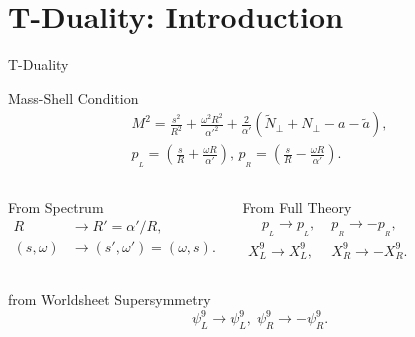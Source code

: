 \section{T-Duality: Introduction}
\begin{frame}{T-Duality}
	\begin{block}{Mass-Shell Condition}
		\setlength\abovedisplayskip{0pt}
		\begin{gather*}
			M^2 = \frac{s^2}{R^2} + \frac{\omega^2 R^2}{\alpha'^2} + \frac{2}{\alpha'}(\tilde{N}_\perp + N_\perp - a - \tilde{a}), \\
			p_{\!_L} = \left( \frac{s}{R} + \frac{\omega R}{\alpha'} \right), \, p_{\!_R} = \left( \frac{s}{R} - \frac{\omega R}{\alpha'} \right).
		\end{gather*}
	\end{block}
	\begin{columns}
		 \pause
		\begin{block}{From Spectrum}
			\setlength\abovedisplayskip{0pt}
			\begin{align*}
				R & \to R' = {\alpha'}/{R}, \\ (s,\omega) &\to (s',\omega') = (\omega, s) .
			\end{align*}
		\end{block}
		 \pause
		\begin{block}{From Full Theory}
			\setlength\abovedisplayskip{0pt}
			\begin{align*}
				\quad p_{\!_L} \to p_{\!_L}, \; & p_{\!_R} \to - p_{\!_R} , \\
				X^9_L \to X^9_L, \;             & X^9_R \to -X^9_R .
			\end{align*}
		\end{block}
	\end{columns} \pause
	\begin{block}{from Worldsheet Supersymmetry}
		\begin{equation*}
			\psi^9_L \to \psi^9_L, \; \psi^9_R \to -\psi^9_R.
		\end{equation*}
	\end{block}
\end{frame}

